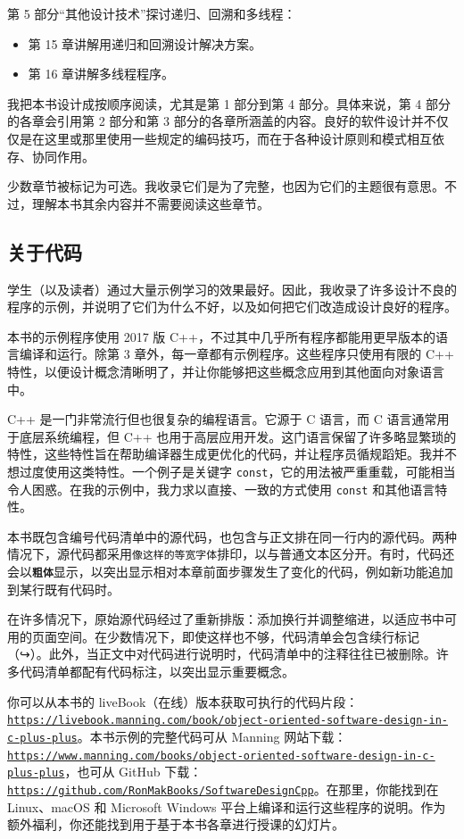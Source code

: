 第 5 部分“其他设计技术”探讨递归、回溯和多线程：

\begin{itemize}
\item 第 15 章讲解用递归和回溯设计解决方案。
\item 第 16 章讲解多线程程序。
\end{itemize}

我把本书设计成按顺序阅读，尤其是第 1 部分到第 4 部分。具体来说，第 4 部分的各章会引用第 2 部分和第 3 部分的各章所涵盖的内容。良好的软件设计并不仅仅是在这里或那里使用一些规定的编码技巧，而在于各种设计原则和模式相互依存、协同作用。

少数章节被标记为可选。我收录它们是为了完整，也因为它们的主题很有意思。不过，理解本书其余内容并不需要阅读这些章节。

\subsection{关于代码}

学生（以及读者）通过大量示例学习的效果最好。因此，我收录了许多设计不良的程序的示例，并说明了它们为什么不好，以及如何把它们改造成设计良好的程序。

本书的示例程序使用 2017 版 C++，不过其中几乎所有程序都能用更早版本的语言编译和运行。除第 3 章外，每一章都有示例程序。这些程序只使用有限的 C++ 特性，以便设计概念清晰明了，并让你能够把这些概念应用到其他面向对象语言中。

C++ 是一门非常流行但也很复杂的编程语言。它源于 C 语言，而 C 语言通常用于底层系统编程，但 C++ 也用于高层应用开发。这门语言保留了许多略显繁琐的特性，这些特性旨在帮助编译器生成更优化的代码，并让程序员循规蹈矩。我并不想过度使用这类特性。一个例子是关键字 \texttt{const}，它的用法被严重重载，可能相当令人困惑。在我的示例中，我力求以直接、一致的方式使用 \texttt{const} 和其他语言特性。

本书既包含编号代码清单中的源代码，也包含与正文排在同一行内的源代码。两种情况下，源代码都采用\texttt{像这样的等宽字体}排印，以与普通文本区分开。有时，代码还会以\texttt{\textbf{粗}\textbf{体}}显示，以突出显示相对本章前面步骤发生了变化的代码，例如新功能追加到某行既有代码时。

在许多情况下，原始源代码经过了重新排版：添加换行并调整缩进，以适应书中可用的页面空间。在少数情况下，即使这样也不够，代码清单会包含续行标记（↪）。此外，当正文中对代码进行说明时，代码清单中的注释往往已被删除。许多代码清单都配有代码标注，以突出显示重要概念。

你可以从本书的 liveBook（在线）版本获取可执行的代码片段：\href{https://livebook.manning.com/book/object-oriented-software-design-in-c-plus-plus}{\nolinkurl{https://livebook.manning.com/book/object-oriented-software-design-in-c-plus-plus}}。本书示例的完整代码可从 Manning 网站下载：\href{https://www.manning.com/books/object-oriented-software-design-in-c-plus-plus}{\nolinkurl{https://www.manning.com/books/object-oriented-software-design-in-c-plus-plus}}，也可从 GitHub 下载：\href{https://github.com/RonMakBooks/SoftwareDesignCpp}{\nolinkurl{https://github.com/RonMakBooks/SoftwareDesignCpp}}。在那里，你能找到在 Linux、macOS 和 Microsoft Windows 平台上编译和运行这些程序的说明。作为额外福利，你还能找到用于基于本书各章进行授课的幻灯片。

